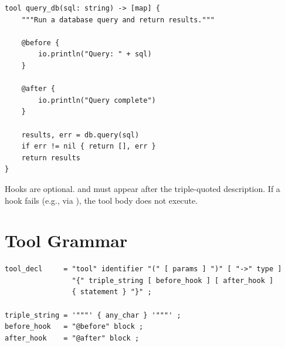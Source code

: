 \begin{lstlisting}
tool query_db(sql: string) -> [map] {
    """Run a database query and return results."""

    @before {
        io.println("Query: " + sql)
    }

    @after {
        io.println("Query complete")
    }

    results, err = db.query(sql)
    if err != nil { return [], err }
    return results
}
\end{lstlisting}

\begin{note}
Hooks are optional.  and  must appear after the triple-quoted description. If a  hook fails (e.g., via ), the tool body does not execute.
\end{note}

\section{Tool Grammar}

\begin{lstlisting}[language=EBNF]
tool_decl     = "tool" identifier "(" [ params ] ")" [ "->" type ]
                "{" triple_string [ before_hook ] [ after_hook ]
                { statement } "}" ;

triple_string = '"""' { any_char } '"""' ;
before_hook   = "@before" block ;
after_hook    = "@after" block ;
\end{lstlisting}

